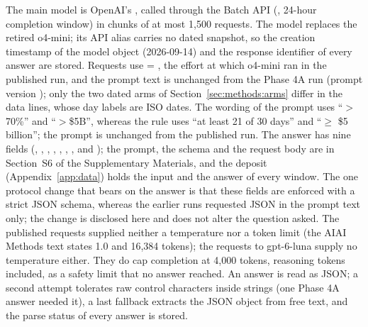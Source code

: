 The main model is OpenAI's , called through the Batch API (, 24-hour completion window) in chunks of at most 1{,}500 requests. The model replaces the retired o4-mini; its API alias carries no dated snapshot, so the creation timestamp of the model object (2026-09-14) and the response identifier of every answer are stored. Requests use  = , the effort at which o4-mini ran in the published run, and the prompt text is unchanged from the Phase 4A run (prompt version ); only the two dated arms of Section~\ref{sec:methods:arms} differ in the data lines, whose day labels are ISO dates. The wording of the prompt uses ``$>$70\%'' and ``$>$\$5B'', whereas the rule uses ``at least 21 of 30 days'' and ``$\geq$ \$5 billion''; the prompt is unchanged from the published run. The answer has nine fields (, , , , , , ,  and ); the prompt, the schema and the request body are in Section~S6 of the Supplementary Materials, and the deposit (Appendix~\ref{app:data}) holds the input and the answer of every window. The one protocol change that bears on the answer is that these fields are enforced with a strict JSON schema, whereas the earlier runs requested JSON in the prompt text only; the change is disclosed here and does not alter the question asked. The published requests supplied neither a temperature nor a token limit (the AIAI Methods text states 1.0 and 16{,}384 tokens); the requests to gpt-6-luna supply no temperature either. They do cap completion at 4{,}000 tokens, reasoning tokens included, as a safety limit that no answer reached. An answer is read as JSON; a second attempt tolerates raw control characters inside strings (one Phase 4A answer needed it), a last fallback extracts the JSON object from free text, and the parse status of every answer is stored.

